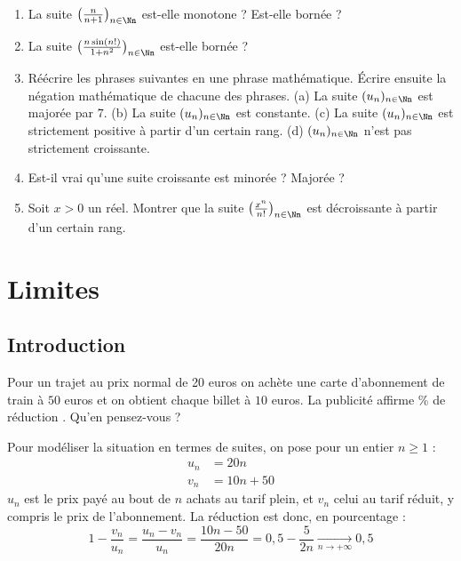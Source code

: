 \documentclass[class=report,crop=false]{standalone}
\begin{document}
\begin{miniexercices}
\sauteligne
\begin{enumerate}
  \item La suite $\big(\frac{n}{n+1}\big)_{n\in \Nn}$ est-elle monotone ? Est-elle bornée ?
  \item La suite $\big(\frac{n\sin(n!)}{1+n^2}\big)_{n\in \Nn}$ est-elle bornée ?
  \item Réécrire les phrases suivantes en une phrase mathématique.
  \'Ecrire ensuite la négation mathématique de chacune des phrases.
  (a) La suite $(u_n)_{n\in\Nn}$ est majorée par $7$.
  (b) La suite $(u_n)_{n\in\Nn}$ est constante.
  (c) La suite $(u_n)_{n\in\Nn}$ est strictement positive à partir d'un certain rang.
  (d) $(u_n)_{n\in\Nn}$ n'est pas strictement croissante.
  \item Est-il vrai qu'une suite croissante est minorée ? Majorée ?
  \item Soit $x>0$ un réel. Montrer que la suite $\left(\frac{x^n}{n!}\right)_{n\in \Nn}$
  est décroissante à partir d'un certain rang.
\end{enumerate}
\end{miniexercices}


\section{Limites}

\subsection{Introduction}
Pour un trajet au prix normal de 20 euros on achète une carte d'abonnement de train à $50$ euros
et on obtient chaque billet à $10$ euros.
La publicité affirme \% de réduction \fg{}. Qu'en pensez-vous ?

Pour modéliser la situation en termes de suites, on pose pour un entier $n\geq 1$ :
\begin{align*}
  u_n&=20n \\
  v_n&=10n+50
\end{align*}
$u_n$ est le prix payé au bout de $n$ achats au tarif plein, et $v_n$ celui au tarif réduit,
y compris le prix de l'abonnement. La réduction est donc, en pourcentage :
$$1-\frac{v_n}{u_n}=\frac{u_n-v_n}{u_n}=\frac{10n-50}{20n}=0,5 -\frac{5}{2n}\xrightarrow[n\to +\infty]{}0,5 $$
\end{document}
